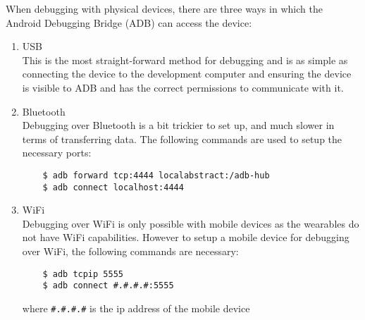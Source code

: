 When debugging with physical devices, there are three ways in which the Android
Debugging Bridge (ADB) can access the device:

\begin{enumerate}

\item USB\\
    This is the most straight-forward method for debugging and is as simple as
    connecting the device to the development computer and ensuring the device is
    visible to ADB and has the correct permissions to communicate with it.
\item Bluetooth\\
    Debugging over Bluetooth is a bit trickier to set up, and much slower in
    terms of transferring data. The following commands are used to setup the
    necessary ports:
    \begin{lstlisting}
    $ adb forward tcp:4444 localabstract:/adb-hub
    $ adb connect localhost:4444
    \end{lstlisting}
\item WiFi\\
    Debugging over WiFi is only possible with mobile devices as the wearables
    do not have WiFi capabilities. However to setup a mobile device for
    debugging over WiFi, the following commands are necessary:
    \begin{lstlisting}
    $ adb tcpip 5555
    $ adb connect #.#.#.#:5555
    \end{lstlisting}
    where \texttt{\#.\#.\#.\#} is the ip address of the mobile device
\end{enumerate}
